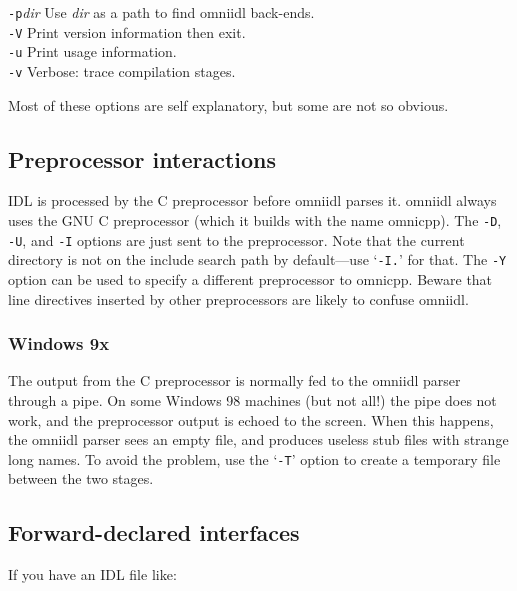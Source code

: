 \documentclass[11pt,twoside,a4paper]{book}
\newcommand{\cmdline}[1]{\texttt{#1}}
\begin{document}
\begin{tabbing}
\cmdline{-p}\textit{dir}
     \> Use \textit{dir} as a path to find omniidl back-ends.\\

\cmdline{-V}
     \> Print version information then exit.\\

\cmdline{-u}
     \> Print usage information.\\

\cmdline{-v}
     \> Verbose: trace compilation stages.\\

\end{tabbing}

\noindent Most of these options are self explanatory, but some are not
so obvious.

\subsection{Preprocessor interactions}

IDL is processed by the C preprocessor before omniidl parses it.
omniidl always uses the GNU C preprocessor (which it builds with the
name omnicpp). The \cmdline{-D}, \cmdline{-U}, and \cmdline{-I}
options are just sent to the preprocessor. Note that the current
directory is not on the include search path by default---use
`\cmdline{-I.}' for that. The \cmdline{-Y} option can be used to
specify a different preprocessor to omnicpp. Beware that line
directives inserted by other preprocessors are likely to confuse
omniidl.

\subsubsection{Windows 9x}

The output from the C preprocessor is normally fed to the omniidl
parser through a pipe. On some Windows 98 machines (but not all!)  the
pipe does not work, and the preprocessor output is echoed to the
screen. When this happens, the omniidl parser sees an empty file, and
produces useless stub files with strange long names. To avoid the
problem, use the `\cmdline{-T}' option to create a temporary file
between the two stages.


\subsection{Forward-declared interfaces}

If you have an IDL file like:
\end{document}
